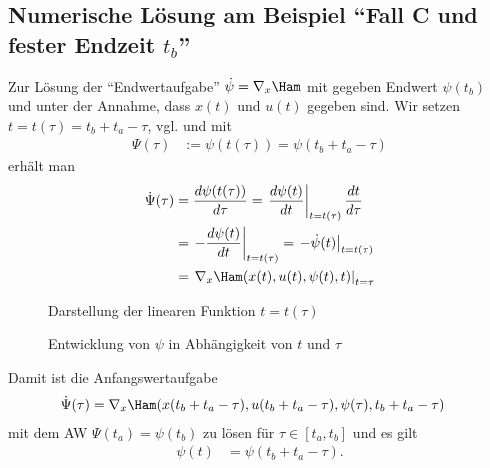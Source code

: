 \subsection{Numerische Lösung am Beispiel "`Fall C und fester Endzeit $t_b$"'}
Zur Lösung der "`Endwertaufgabe"' $\dot{\psi}=\nabla_x \Ham$ mit gegeben Endwert $\psi(t_b)$ und unter der Annahme, dass $x(t)$ und $u(t)$ gegeben
sind. Wir setzen $t=t(\tau)=t_b+t_a-\tau$, vgl.  und mit 
\begin{align*}
	\Psi(\tau) & := \psi(t(\tau)) = \psi(t_b+t_a-\tau)
\end{align*}
erhält man 
\begin{align*}
	\dot{\Psi}(\tau) & = \frac{d\psi(t(\tau))}{d\tau} = \left.\frac{d\psi(t)}{dt}\right|_{t=t(\tau)}\frac{dt}{d\tau}\\
	& = \left.-\frac{d\psi(t)}{dt}\right|_{t=t(\tau)}=\left.-\dot{\psi}(t)\right|_{t=t(\tau)}\\
	& = \left.\nabla_x \Ham(x(t),u(t),\psi(t),t)\right|_{t=\tau}
\end{align*}
\begin{figure}[htb]
	\centering
	
	\caption{Darstellung der linearen Funktion $t=t(\tau)$}
	\label{fig:kap_2_fallc_tbfest_ttau}
\end{figure}
\begin{figure}[htb]
	\centering
	
	\caption{Entwicklung von $\psi$ in Abhängigkeit von $t$ und $\tau$}
	\label{fig:kap_2_fallc_tbfest_psi}
\end{figure}
Damit ist die Anfangswertaufgabe 
\begin{align*}
	\dot{\Psi}(\tau) & = \nabla_x \Ham(x(t_b+t_a-\tau),u(t_b+t_a-\tau),\psi(\tau),t_b+t_a-\tau)
\end{align*}
mit dem \ac{AW} $\Psi(t_a)=\psi(t_b)$ zu lösen für $\tau\in[t_a,t_b]$ und es gilt
\begin{align*}
	\psi(t) & = \psi(t_b+t_a-\tau).
\end{align*}

